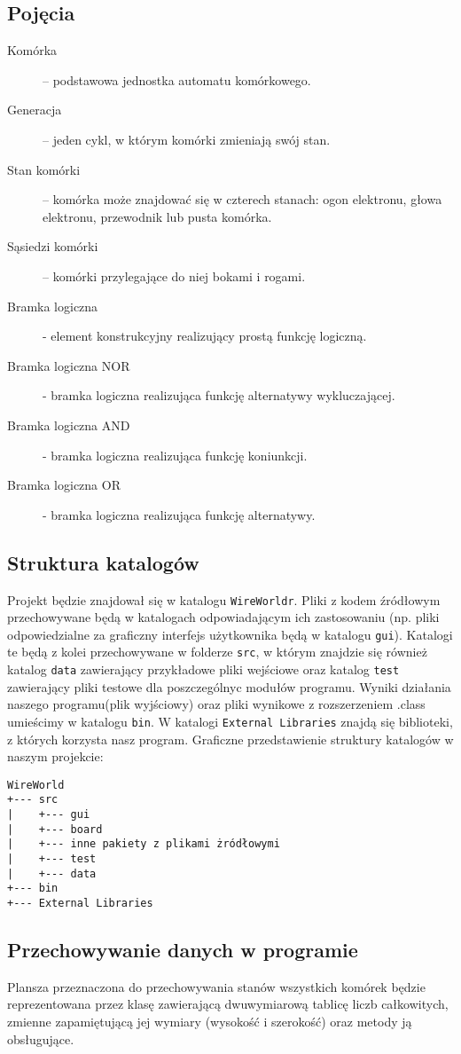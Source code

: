 \documentclass[a4paper,11pt, notitlepage ]{article}
\begin{document}
\subsection{Pojęcia}
\begin{description}
\item[Komórka] – podstawowa jednostka automatu komórkowego.
\item[Generacja] – jeden cykl, w którym komórki zmieniają swój stan.
\item[Stan komórki] – komórka może znajdować się w czterech stanach: ogon elektronu, głowa elektronu, przewodnik lub pusta komórka.
\item[Sąsiedzi komórki] – komórki przylegające do niej bokami i rogami.
\item[Bramka logiczna] - element konstrukcyjny realizujący prostą funkcję logiczną.
\item[Bramka logiczna NOR] - bramka logiczna realizująca funkcję alternatywy wykluczającej.
\item[Bramka logiczna AND] - bramka logiczna realizująca funkcję koniunkcji.
\item[Bramka logiczna OR] - bramka logiczna realizująca funkcję alternatywy.

\end{description}
\subsection{Struktura katalogów}
Projekt będzie znajdował się w katalogu \verb+WireWorldr+.  Pliki z kodem źródłowym przechowywane będą w katalogach odpowiadającym ich zastosowaniu (np. pliki odpowiedzialne za graficzny interfejs użytkownika będą w katalogu \verb+gui+). Katalogi te będą z kolei przechowywane w folderze \verb+src+, w którym znajdzie się również katalog \verb+data+ zawierający przykładowe pliki wejściowe oraz katalog \verb+test+ zawierający pliki testowe dla poszczególnyc modułów programu. Wyniki działania naszego programu(plik wyjściowy) oraz pliki wynikowe z rozszerzeniem .class umieścimy w katalogu \verb+bin+. W katalogi \verb+External Libraries+ znajdą się biblioteki, z których korzysta nasz program.
Graficzne przedstawienie struktury katalogów w naszym projekcie:
\begin{verbatim}
WireWorld
+--- src
|    +--- gui 
|    +--- board
|    +--- inne pakiety z plikami żródłowymi
|    +--- test
|    +--- data
+--- bin
+--- External Libraries
\end{verbatim}
\subsection{Przechowywanie danych w programie}
 Plansza przeznaczona do przechowywania stanów wszystkich komórek będzie reprezentowana przez klasę zawierającą dwuwymiarową tablicę liczb całkowitych, zmienne zapamiętującą jej wymiary (wysokość i szerokość) oraz metody ją obsługujące.
\end{document}
